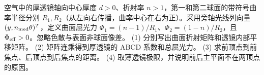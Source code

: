 空气中的厚透镜轴向中心厚度 \(d>0\)、折射率 \(n>1\)，第一和第二球面的带符号曲率半径分别 \(R_1,R_2\)（从左向右传播，曲率中心在右为正）。采用旁轴光线列向量 \((y,n_{\rm med}\theta)^T\)，定义曲面屈光力 \(\Phi_1=(n-1)/R_1\)、\(\Phi_2=(1-n)/R_2\)，且 \(\Phi_{\rm eff}>0\)。忽略色散与表面非球面像差。
(1) 分别写出曲面折射矩阵和透镜内部平移矩阵。
(2) 矩阵连乘得到厚透镜的 ABCD 系数和总屈光力。
(3) 求前顶点到前焦点、后顶点到后焦点的距离。
(4) 取薄透镜极限，并说明前后主平面不在两顶点的原因。
